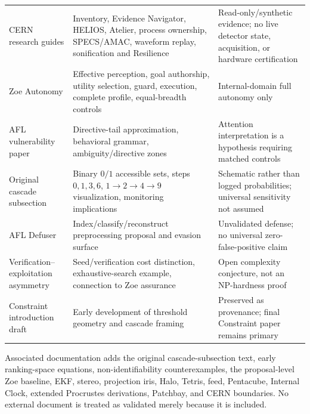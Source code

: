 \begin{table}[htbp]
{\begin{tabularx}{\textwidth}{p{4.0cm}Xp{3.5cm}}
CERN research guides&Inventory, Evidence Navigator, HELIOS, Atelier, process ownership, SPECS/AMAC, waveform replay, sonification and Resilience&Read-only/synthetic evidence; no live detector state, acquisition, or hardware certification\\
Zoe Autonomy&Effective perception, goal authorship, utility selection, guard, execution, complete profile, equal-breadth controls&Internal-domain full autonomy only\\
AFL vulnerability paper&Directive-tail approximation, behavioral grammar, ambiguity/directive zones&Attention interpretation is a hypothesis requiring matched controls\\
Original cascade subsection&Binary $0/1$ accessible sets, steps $0,1,3,6$, $1\rightarrow2\rightarrow4\rightarrow9$ visualization, monitoring implications&Schematic rather than logged probabilities; universal sensitivity not assumed\\
AFL Defuser&Index/classify/reconstruct preprocessing proposal and evasion surface&Unvalidated defense; no universal zero-false-positive claim\\
Verification--exploitation asymmetry&Seed/verification cost distinction, exhaustive-search example, connection to Zoe assurance&Open complexity conjecture, not an NP-hardness proof\\
Constraint introduction draft&Early development of threshold geometry and cascade framing&Preserved as provenance; final Constraint paper remains primary\\
\bottomrule
\end{tabularx}}
\end{table}

Associated documentation adds the original cascade-subsection text, early ranking-space equations, non-identifiability counterexamples, the proposal-level Zoe baseline, EKF, stereo, projection iris, Halo, Tetris, feed, Pentacube, Internal Clock, extended Procrustes derivations, Patchbay, and CERN boundaries. No external document is treated as validated merely because it is included.

